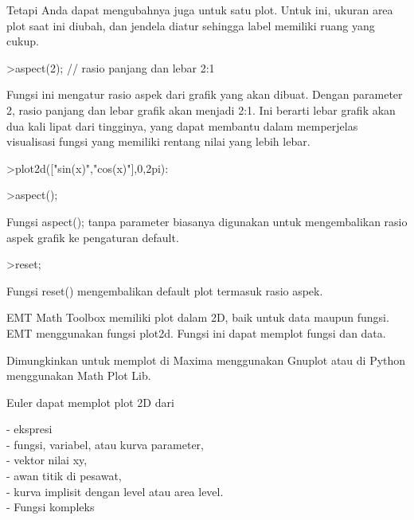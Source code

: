 \documentclass[a4paper,10pt]{article}
\begin{document}
\begin{eulernotebook}
\begin{eulercomment}
Tetapi Anda dapat mengubahnya juga untuk satu plot. Untuk ini, ukuran
area plot saat ini diubah, dan jendela diatur sehingga label memiliki
ruang yang cukup.
\end{eulercomment}
\begin{eulerprompt}
>aspect(2); // rasio panjang dan lebar 2:1
\end{eulerprompt}
\begin{eulercomment}
Fungsi ini mengatur rasio aspek dari grafik yang akan dibuat. Dengan
parameter 2, rasio panjang dan lebar grafik akan menjadi 2:1. Ini
berarti lebar grafik akan dua kali lipat dari tingginya, yang dapat
membantu dalam memperjelas visualisasi fungsi yang memiliki rentang
nilai yang lebih lebar.
\end{eulercomment}
\begin{eulerprompt}
>plot2d(["sin(x)","cos(x)"],0,2pi):
\end{eulerprompt}
\begin{eulerprompt}
>aspect();
\end{eulerprompt}
\begin{eulercomment}
Fungsi aspect(); tanpa parameter biasanya digunakan untuk
mengembalikan rasio aspek grafik ke pengaturan default.
\end{eulercomment}
\begin{eulerprompt}
>reset;
\end{eulerprompt}
\begin{eulercomment}
Fungsi reset() mengembalikan default plot termasuk rasio aspek.\\
\begin{eulercomment}
\begin{eulercomment}
EMT Math Toolbox memiliki plot dalam 2D, baik untuk data maupun
fungsi. EMT menggunakan fungsi plot2d. Fungsi ini dapat memplot fungsi
dan data.

Dimungkinkan untuk memplot di Maxima menggunakan Gnuplot atau di
Python menggunakan Math Plot Lib.

Euler dapat memplot plot 2D dari

- ekspresi\\
- fungsi, variabel, atau kurva parameter,\\
- vektor nilai xy,\\
- awan titik di pesawat,\\
- kurva implisit dengan level atau area level.\\
- Fungsi kompleks


\end{eulercomment}
\end{eulercomment}
\end{eulercomment}
\end{eulernotebook}
\end{document}
